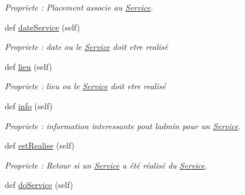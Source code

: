 \begin{DoxyCompactItemize}
\begin{DoxyCompactList}\small\item\em Propriete \+: Placement associe au \hyperlink{classsrc_1_1m_1_1_service_1_1_service}{Service}. \end{DoxyCompactList}\item 
\hypertarget{classsrc_1_1m_1_1_service_1_1_service_a9cbaaa5d9ab9c306e3baefbbee6c8eaa}{}def \hyperlink{classsrc_1_1m_1_1_service_1_1_service_a9cbaaa5d9ab9c306e3baefbbee6c8eaa}{date\+Service} (self)\label{classsrc_1_1m_1_1_service_1_1_service_a9cbaaa5d9ab9c306e3baefbbee6c8eaa}

\begin{DoxyCompactList}\small\item\em Propriete \+: date ou le \hyperlink{classsrc_1_1m_1_1_service_1_1_service}{Service} doit etre realisé \end{DoxyCompactList}\item 
\hypertarget{classsrc_1_1m_1_1_service_1_1_service_ae641d10a8e3fca7c94a989853e08f105}{}def \hyperlink{classsrc_1_1m_1_1_service_1_1_service_ae641d10a8e3fca7c94a989853e08f105}{lieu} (self)\label{classsrc_1_1m_1_1_service_1_1_service_ae641d10a8e3fca7c94a989853e08f105}

\begin{DoxyCompactList}\small\item\em Propriete \+: lieu ou le \hyperlink{classsrc_1_1m_1_1_service_1_1_service}{Service} doit etre realisé \end{DoxyCompactList}\item 
\hypertarget{classsrc_1_1m_1_1_service_1_1_service_af7be5a2e50d5814626f6bee696eaf3e8}{}def \hyperlink{classsrc_1_1m_1_1_service_1_1_service_af7be5a2e50d5814626f6bee696eaf3e8}{info} (self)\label{classsrc_1_1m_1_1_service_1_1_service_af7be5a2e50d5814626f6bee696eaf3e8}

\begin{DoxyCompactList}\small\item\em Propriete \+: information interessante pout l\textquotesingle{}admin pour un \hyperlink{classsrc_1_1m_1_1_service_1_1_service}{Service}. \end{DoxyCompactList}\item 
\hypertarget{classsrc_1_1m_1_1_service_1_1_service_a3b2c653c9306ee19960fac28b9867e10}{}def \hyperlink{classsrc_1_1m_1_1_service_1_1_service_a3b2c653c9306ee19960fac28b9867e10}{est\+Realise} (self)\label{classsrc_1_1m_1_1_service_1_1_service_a3b2c653c9306ee19960fac28b9867e10}

\begin{DoxyCompactList}\small\item\em Propriete \+: Retour si un \hyperlink{classsrc_1_1m_1_1_service_1_1_service}{Service} a été réalisé du \hyperlink{classsrc_1_1m_1_1_service_1_1_service}{Service}. \end{DoxyCompactList}\item 
\hypertarget{classsrc_1_1m_1_1_service_1_1_service_a8659fd11d9116a1043292eceb76db0d9}{}def \hyperlink{classsrc_1_1m_1_1_service_1_1_service_a8659fd11d9116a1043292eceb76db0d9}{do\+Service} (self)\label{classsrc_1_1m_1_1_service_1_1_service_a8659fd11d9116a1043292eceb76db0d9}


\end{DoxyCompactItemize}
